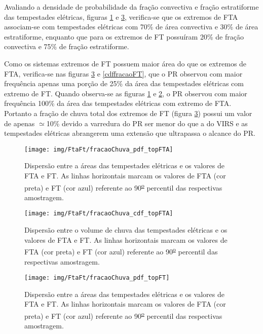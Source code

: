 Avaliando a densidade de probabilidade da fração convectiva e fração estratiforme das tempestades elétricas, figuras \ref{pdffracaoFTA} e \ref{pdffracaoFT}, verifica-se que os extremos de FTA associam-se com tempestades elétricas com 70\% de área convectiva e 30\% de área estratiforme, enquanto que para os extremos de FT possuíram 20\% de fração convectiva e 75\% de fração estratiforme.

Como os sistemas extremos de FT possuem maior área do que os extremos de FTA, verifica-se nas figuras \ref{pdffracaoFT} e \ref{cdffracaoFT}, que o PR observou com maior frequência apenas uma porção de 25\% da área das tempestades elétricas com extremo de FT. Quando observa-se as figuras \ref{pdffracaoFTA} e \ref{cdffracaoFTA}, o PR observou com maior frequência 100\% da área das tempestades elétricas com extremo de FTA. Portanto a fração de chuva total dos extremos de FT (figura \ref{pdffracaoFT}) possui um valor de apenas $\simeq$10\% devido a varredura do PR ser menor do que a do VIRS e as tempestades elétricas abrangerem uma extensão que ultrapassa o alcance do PR. 

\begin{figure}[!ht]
  \centering
  \texttt{[image: img/FtaFt/fracaoChuva\_pdf\_topFTA]}   
  \caption{Dispersão entre a áreas das tempestades elétricas e os valores de FTA e FT. As linhas horizontais marcam os valores de FTA (cor preta) e FT (cor azul) referente ao 90\textsuperscript{\underline{o}} percentil das respectivas amostragem.}
  \label{pdffracaoFTA}  
\end{figure}

\begin{figure}[!hb]
  \centering 
  \texttt{[image: img/FtaFt/fracaoChuva\_cdf\_topFTA]}
  \caption{Dispersão entre o volume de chuva das tempestades elétricas e os valores de FTA e FT.  As linhas horizontais marcam os valores de FTA (cor preta) e FT (cor azul) referente ao 90\textsuperscript{\underline{o}} percentil das respectivas amostragem.}
  \label{cdffracaoFTA}
\end{figure}


\begin{figure}[!ht]
  \centering
  \texttt{[image: img/FtaFt/fracaoChuva\_pdf\_topFT]}   
  \caption{Dispersão entre a áreas das tempestades elétricas e os valores de FTA e FT. As linhas horizontais marcam os valores de FTA (cor preta) e FT (cor azul) referente ao 90\textsuperscript{\underline{o}} percentil das respectivas amostragem.}
  \label{pdffracaoFT}  
\end{figure}

